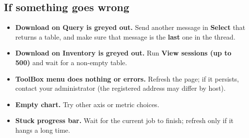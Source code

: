 \documentclass{article}
\begin{document}
\subsection{If something goes wrong}
\label{sec:troubleshooting}

\begin{itemize}[nosep]
  \item \textbf{Download on Query is greyed out.} Send another message in \textbf{Select} that returns a table, and make sure that message is the \textbf{last} one in the thread.
  \item \textbf{Download on Inventory is greyed out.} Run \textbf{View sessions (up to 500)} and wait for a non-empty table.
  \item \textbf{ToolBox menu does nothing or errors.} Refresh the page; if it persists, contact your administrator (the registered address may differ by host).
  \item \textbf{Empty chart.} Try other axis or metric choices.
  \item \textbf{Stuck progress bar.} Wait for the current job to finish; refresh only if it hangs a long time.
\end{itemize}
\end{document}
